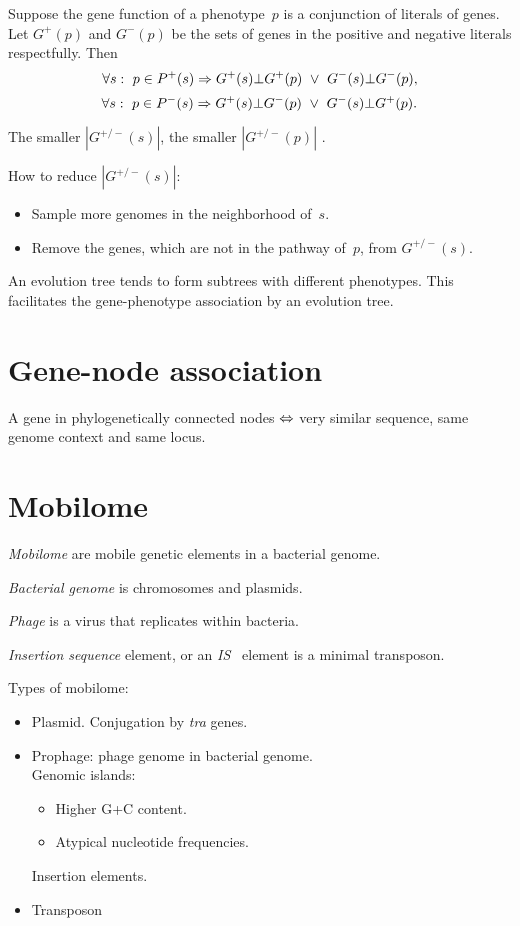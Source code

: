 \documentclass[10pt,a4paper]{article}
\theoremstyle{plain} \newtheorem{Lem}{Lemma}
\begin{document}
Suppose the gene function of a phenotype~$p$ is a conjunction of literals of genes.
Let $G^+(p)$ and $G^-(p)$ be the sets of genes in the positive and negative literals respectfully.
Then
$$ \forall s: \ p \in P^+(s) \Rightarrow G^+(s) \bot G^+(p) \ \vee \  G^-(s) \bot G^-(p), $$
$$ \forall s: \ p \in P^-(s) \Rightarrow G^+(s) \bot G^-(p) \ \vee \  G^-(s) \bot G^+(p). $$

The smaller $|G^{+/-}(s)|$, the smaller $|G^{+/-}(p)|$ .

How to reduce $|G^{+/-}(s)|$:
\begin{itemize}
  \item Sample more genomes in the neighborhood of~$s$.
  \item Remove the genes, which are not in the pathway of~$p$, from $G^{+/-}(s)$.
\end{itemize}

\comm {}
An evolution tree tends to form subtrees with different phenotypes.
This facilitates the gene-phenotype association by an evolution tree.


\section {Gene-node association}

A gene in phylogenetically connected nodes $\Leftrightarrow$ very similar sequence, same genome context and same locus.



\section{Mobilome}
{\em Mobilome} are mobile genetic elements in a bacterial genome.

{\em Bacterial genome} is chromosomes and plasmids.

{\em Phage} is a virus that replicates within bacteria.

{\em Insertion sequence} element, or an {\em IS} \ element is a minimal transposon.

Types of mobilome:
\begin{itemize}
  \item Plasmid. Conjugation by {\em tra} genes.
  \item Prophage: phage genome in bacterial genome.
        \\
        Genomic islands:
        \begin{itemize}
          \item Higher G+C content.
          \item Atypical nucleotide frequencies.
        \end{itemize}
        Insertion elements.
  \item Transposon
\end{itemize}
\end{document}
